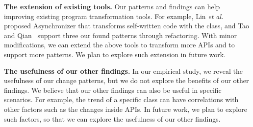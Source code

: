 \noindent
\textbf{The extension of existing tools.} Our patterns and findings can help improving existing program transformation tools. For example,  Lin \emph{et al.}~\cite{conf/sigsoft/LinRD14} proposed Asynchronizer that transforms self-written code with the  class, and Tao and Qian~\cite{tao2014refactoring} support three our found patterns through refactoring. With minor modifications, we can extend the above tools to transform more APIs and to support more patterns. We plan to explore such extension in future work.

\noindent
\textbf{The usefulness of our other findings.} In our empirical study, we reveal the usefulness of our change patterns, but we do not explore the benefits of our other findings. We believe that our other findings can also be useful in specific scenarios. For example, the trend of a specific class can have correlations with other factors such as the changes inside APIs. In future work, we plan to explore such factors, so that we can explore the usefulness of our other findings.
